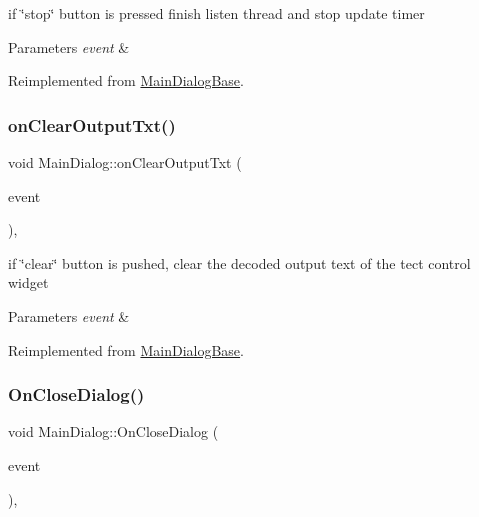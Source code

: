 if \char`\"{}stop\char`\"{} button is pressed finish listen thread and stop update timer 


\begin{DoxyParams}{Parameters}
{\em event} & \\
\hline
\end{DoxyParams}


Reimplemented from \hyperlink{classMainDialogBase}{Main\+Dialog\+Base}.

\mbox{\label{classMainDialog_a121d263ec1ae91147a8947dad64b984f}} 
\subsubsection{\texorpdfstring{on\+Clear\+Output\+Txt()}{onClearOutputTxt()}}
{\footnotesize\ttfamily void Main\+Dialog\+::on\+Clear\+Output\+Txt (\begin{DoxyParamCaption}\item[{wx\+Command\+Event \&}]{event }\end{DoxyParamCaption})\hspace{0.3cm}{\ttfamily [protected]}, {\ttfamily [virtual]}}



if \char`\"{}clear\char`\"{} button is pushed, clear the decoded output text of the tect control widget 


\begin{DoxyParams}{Parameters}
{\em event} & \\
\hline
\end{DoxyParams}


Reimplemented from \hyperlink{classMainDialogBase}{Main\+Dialog\+Base}.

\mbox{\label{classMainDialog_a17fec54d5486bc4e44052bcef47f3fcc}} 
\subsubsection{\texorpdfstring{On\+Close\+Dialog()}{OnCloseDialog()}}
{\footnotesize\ttfamily void Main\+Dialog\+::\+On\+Close\+Dialog (\begin{DoxyParamCaption}\item[{wx\+Close\+Event \&}]{event }\end{DoxyParamCaption})\hspace{0.3cm}{\ttfamily [protected]}, {\ttfamily [virtual]}}



